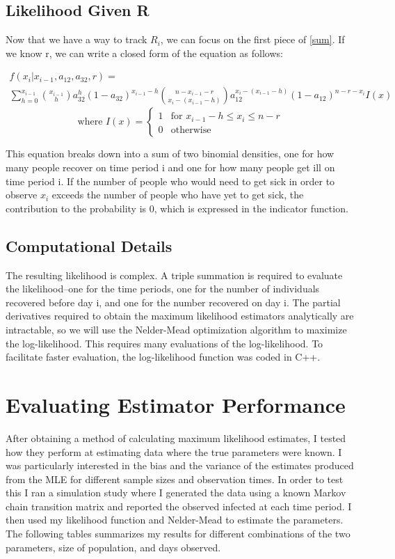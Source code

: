 \documentclass{svproc}
\begin{document}
\subsection*{Likelihood Given R}
Now that we have a way to track $R_i$, we can focus on the first piece of \eqref{sum}. If we know r, we can write a closed form of the equation as follows:

\begin{multline}
f(x_i|x_{i-1}, a_{12}, a_{32}, r) = \\ \sum_{h=0}^{x_{i-1}}       {{x_{i-1}}\choose{h}} a_{32}^h(1-a_{32})^{x_{i-1}-h}  {{n-x_{i-1}-r}\choose{x_i-(x_{i-1}-h)}}  a_{12}^{x_i-(x_{i-1}-h)} (1-a_{12})^{n - r - x_i}I(x)  \end{multline} $$
\text{where } I(x) = \begin{cases} 1 & \text{for } x_{i-1}-h\leq x_i\leq n-r  \\ 0 &\text{otherwise} \end{cases}$$

This equation breaks down into a sum of two binomial densities, one for how many people recover on time period i and one for how many people get ill on time period i. If the number of people who would need to get sick in order to observe $x_i$ exceeds the number of people who have yet to get sick, the contribution to the probability is 0, which is expressed in the indicator function.

\subsection*{Computational Details}
The resulting likelihood is complex. A triple summation is required to evaluate the likelihood--one for the time periods, one for the number of individuals recovered before day i, and one for the number recovered on day i. The partial derivatives required to obtain the maximum likelihood estimators analytically are intractable, so we will use the Nelder-Mead optimization algorithm to maximize the log-likelihood. This requires many evaluations of the log-likelihood. To facilitate faster evaluation, the log-likelihood function was coded in C++.

\section{Evaluating Estimator Performance}
After obtaining a method of calculating maximum likelihood estimates, I tested how they perform at estimating data where the true parameters were known. I was particularly interested in the bias and the variance of the estimates produced from the MLE for different sample sizes and observation times. In order to test this I ran a simulation study where I generated the data using a known Markov chain transition matrix and reported the observed infected at each time period. I then used my likelihood function and Nelder-Mead to estimate the parameters. The following tables summarizes my results for different combinations of the two parameters, size of population, and days observed.
\end{document}

